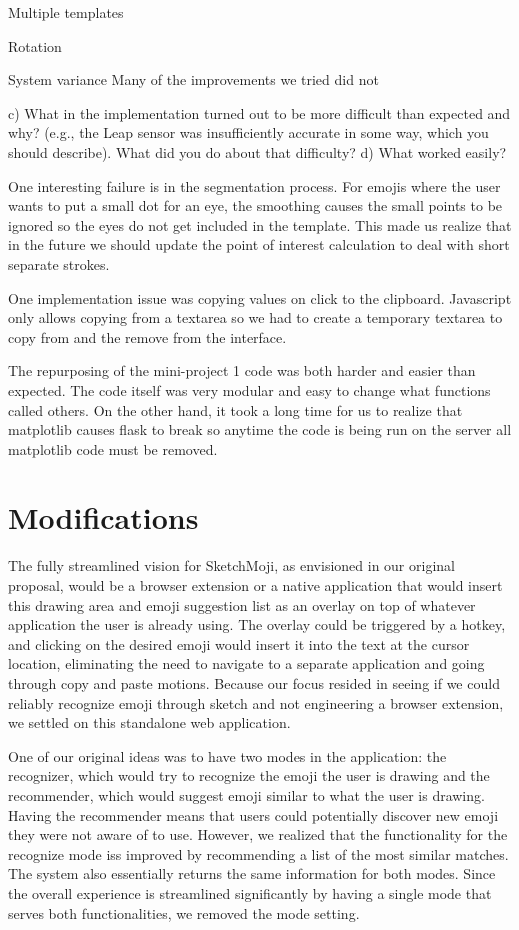 \documentclass{article}
\begin{document}
Multiple templates

Rotation

System variance
Many of the improvements we tried did not

c) What in the implementation turned out to be more difficult than expected and why? (e.g., the Leap sensor was insufficiently accurate in some way, which you should describe). What did you do about that difficulty?
d) What worked easily?



One interesting failure is in the segmentation process. For emojis where the user wants to put a small dot for an eye, the smoothing causes the small points to be ignored so the eyes do not get included in the template. This made us realize that in the future we should update the point of interest calculation to deal with short separate strokes.

One implementation issue was copying values on click to the clipboard. Javascript only allows copying from a textarea so we had to create a temporary textarea to copy from and the remove from the interface.

The repurposing of the mini-project 1 code was both harder and easier than expected. The code itself was very modular and easy to change what functions called others. On the other hand, it took a long time for us to realize that matplotlib causes flask to break so anytime the code is being run on the server all matplotlib code must be removed.

\section{Modifications}

The fully streamlined vision for SketchMoji, as envisioned in our original proposal, would be a browser extension or a native application that would insert this drawing area and emoji suggestion list as an overlay on top of whatever application the user is already using. The overlay could be triggered by a hotkey, and clicking on the desired emoji would insert it into the text at the cursor location, eliminating the need to navigate to a separate application and going through copy and paste motions. Because our focus resided in seeing if we could reliably recognize emoji through sketch and not engineering a browser extension, we settled on this standalone web application.

One of our original ideas was to have two modes in the application: the recognizer, which would try to recognize the emoji the user is drawing and the recommender, which would suggest emoji similar to what the user is drawing. Having the recommender means that users could potentially discover new emoji they were not aware of to use. However, we realized that the functionality for the recognize mode iss improved by recommending a list of the most similar matches. The system also essentially returns the same information for both modes. Since the overall experience is streamlined significantly by having a single mode that serves both functionalities, we removed the mode setting.
\end{document}
